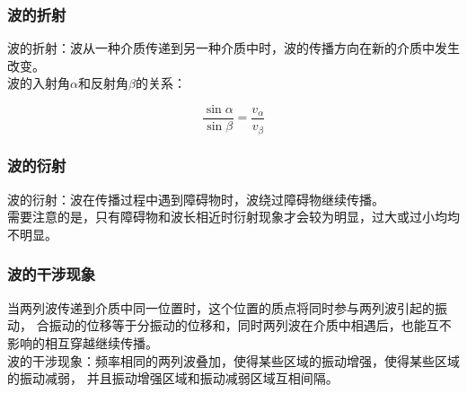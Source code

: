 \documentclass[UTF8]{ctexart}
\begin{document}
\subsubsection{波的折射}
    波的折射：波从一种介质传递到另一种介质中时，波的传播方向在新的介质中发生改变。\\[3mm]
    波的入射角$\alpha$和反射角$\beta$的关系：
    \begin{large}
        \begin{equation*}
            \frac{\sin{\alpha}}{\sin{\beta}}=\frac{v_\alpha}{v_\beta}
        \end{equation*}
    \end{large}

\subsubsection{波的衍射}
    波的衍射：波在传播过程中遇到障碍物时，波绕过障碍物继续传播。\\[3mm]
    需要注意的是，只有障碍物和波长相近时衍射现象才会较为明显，过大或过小均均不明显。

\newpage

\subsubsection{波的干涉现象}
    当两列波传递到介质中同一位置时，这个位置的质点将同时参与两列波引起的振动，
    合振动的位移等于分振动的位移和，同时两列波在介质中相遇后，也能互不影响的相互穿越继续传播。\\[3mm]
    波的干涉现象：频率相同的两列波叠加，使得某些区域的振动增强，使得某些区域的振动减弱，
    并且振动增强区域和振动减弱区域互相间隔。
\end{document}
